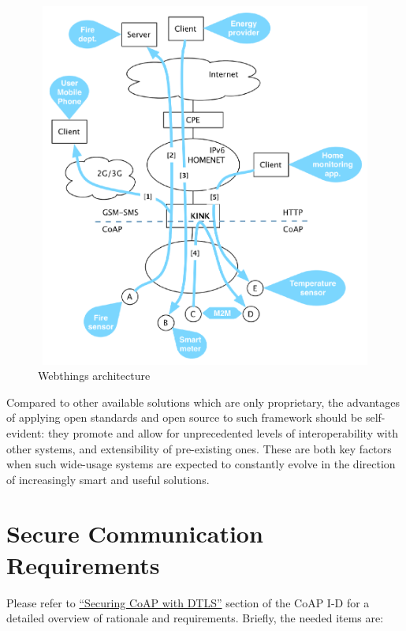 \documentclass[10pt]{article}
\begin{document}
\begin{figure}
  \centering
  \includegraphics[width=12cm,height=12cm]{../share/images/kink-homenet}
    \caption{Webthings architecture}
    \label{fig:arch}
\end{figure}

Compared to other available solutions which are only proprietary, the advantages of applying open standards and open source to such framework should be self-evident: they promote and allow for unprecedented levels of interoperability with other systems, and extensibility of pre-existing ones. These are both key factors when such wide-usage systems are expected to constantly evolve in the direction of increasingly smart and useful solutions.

\section{Secure Communication Requirements}

Please refer to \href{http://tools.ietf.org/html/draft-ietf-core-coap-08#section-10.1}{``Securing CoAP with DTLS''} section of the CoAP I-D for a detailed overview of rationale and requirements.  Briefly, the needed items are:
\end{document}
